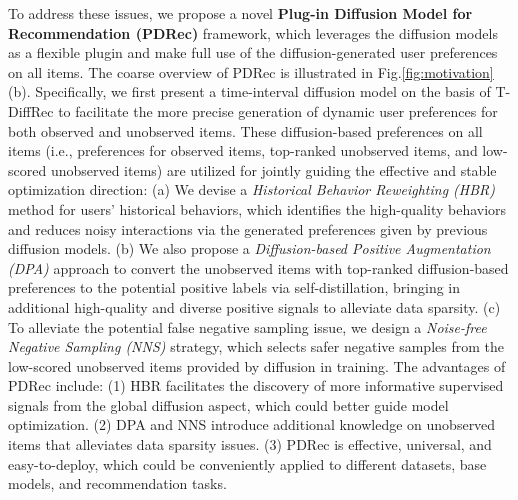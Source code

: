 \documentclass[letterpaper]{article} %
\begin{document}
To address these issues, we propose a novel \textbf{Plug-in Diffusion Model for Recommendation (PDRec)} framework, which leverages the diffusion models as a flexible plugin and make full use of the diffusion-generated user preferences on all items. The coarse overview of PDRec is illustrated in Fig.\ref{fig:motivation} (b). Specifically, we first present a time-interval diffusion model on the basis of T-DiffRec to facilitate the more precise generation of dynamic user preferences for both observed and unobserved items.
These diffusion-based preferences on all items (i.e., preferences for observed items, top-ranked unobserved items, and low-scored unobserved items) are utilized for jointly guiding the effective and stable optimization direction:
(a) We devise a \emph{Historical Behavior Reweighting (HBR)} method for users' historical behaviors, which identifies the high-quality behaviors and reduces noisy interactions via the generated preferences given by previous diffusion models.
(b) We also propose a \emph{Diffusion-based Positive Augmentation (DPA)} approach to convert the unobserved items with top-ranked diffusion-based preferences to the potential positive labels via self-distillation, bringing in additional high-quality and diverse positive signals to alleviate data sparsity.
(c) To alleviate the potential false negative sampling issue, we design a \emph{Noise-free Negative Sampling (NNS)} strategy, which selects safer negative samples from the low-scored unobserved items provided by diffusion in training.
The advantages of PDRec include: (1) HBR facilitates the discovery of more informative supervised signals from the global diffusion aspect, which could better guide model optimization. (2) DPA and NNS introduce additional knowledge on unobserved items that alleviates data sparsity issues. (3) PDRec is effective, universal, and easy-to-deploy, which could be conveniently applied to different datasets, base models, and recommendation tasks.
\end{document}
